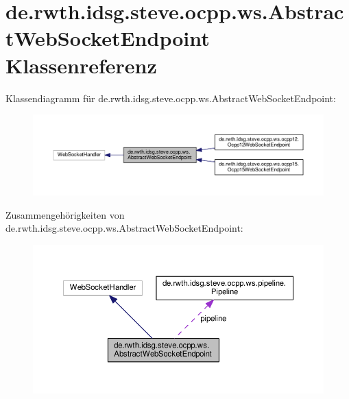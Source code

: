 \hypertarget{classde_1_1rwth_1_1idsg_1_1steve_1_1ocpp_1_1ws_1_1_abstract_web_socket_endpoint}{\section{de.\-rwth.\-idsg.\-steve.\-ocpp.\-ws.\-Abstract\-Web\-Socket\-Endpoint Klassenreferenz}
\label{classde_1_1rwth_1_1idsg_1_1steve_1_1ocpp_1_1ws_1_1_abstract_web_socket_endpoint}
}


Klassendiagramm für de.\-rwth.\-idsg.\-steve.\-ocpp.\-ws.\-Abstract\-Web\-Socket\-Endpoint\-:\nopagebreak
\begin{figure}[H]
\begin{center}
\leavevmode
\includegraphics[width=350pt]{classde_1_1rwth_1_1idsg_1_1steve_1_1ocpp_1_1ws_1_1_abstract_web_socket_endpoint__inherit__graph}
\end{center}
\end{figure}


Zusammengehörigkeiten von de.\-rwth.\-idsg.\-steve.\-ocpp.\-ws.\-Abstract\-Web\-Socket\-Endpoint\-:\nopagebreak
\begin{figure}[H]
\begin{center}
\leavevmode
\includegraphics[width=350pt]{classde_1_1rwth_1_1idsg_1_1steve_1_1ocpp_1_1ws_1_1_abstract_web_socket_endpoint__coll__graph}
\end{center}
\end{figure}
